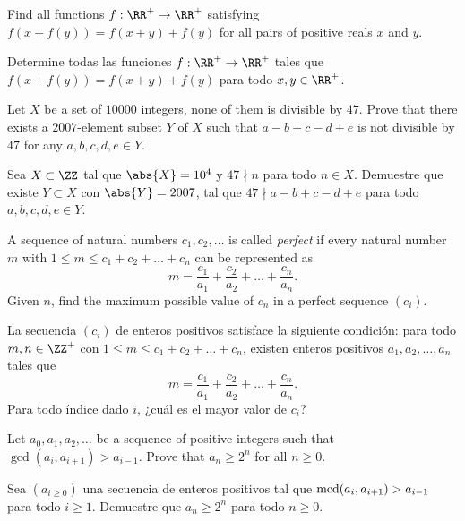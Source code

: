 \begin{probMR}
	Find all functions $f:\RR^+\to\RR^+$ satisfying $f(x+f(y))=f(x+y)+f(y)$ for all pairs of positive reals $x$ and $y$.
	\begin{probSP}
		Determine todas las funciones $f:\RR^+\to\RR^+$ tales que $f(x+f(y))=f(x+y)+f(y)$ para todo $x,y\in\RR^+$.
	\end{probSP}
\end{probMR}

\begin{probMR}
	Let $X$ be a set of $10000$ integers, none of them is divisible by $47$. Prove that there exists a $2007$-element subset $Y$ of $X$ such that $a-b+c-d+e$ is not divisible by $47$ for any $a,b,c,d,e\in Y$.
	\begin{probSP}
		Sea $X\subset\ZZ$ tal que $\abs{X}=10^4$ y $47\nmid n$ para todo $n\in X$. Demuestre que existe $Y\subset X$ con $\abs{Y}=2007$, tal que $47\nmid a-b+c-d+e$ para todo $a,b,c,d,e\in Y$.
	\end{probSP}
\end{probMR}

\begin{probEG}
	A sequence of natural numbers $c_1,c_2,\dots$ is called \emph{perfect} if every natural number $m$ with $1\le m\le c_1+c_2+\dots+c_n$ can be represented as
	\[m=\frac{c_1}{a_1}+\frac{c_2}{a_2}+\dots+\frac{c_n}{a_n}.\]
	Given $n$, find the maximum possible value of $c_n$ in a perfect sequence $(c_i)$.
	\begin{probSP}
		La secuencia $(c_i)$ de enteros positivos satisface la siguiente condición: para todo $m,n\in\ZZ^+$ con $1\le m\le c_1+c_2+\dots+c_n$, existen enteros positivos $a_1,a_2,\dots,a_n$ tales que
		\[m=\frac{c_1}{a_1}+\frac{c_2}{a_2}+\dots+\frac{c_n}{a_n}.\]
		Para todo índice dado $i$, ¿cuál es el mayor valor de $c_i$?
	\end{probSP}
\end{probEG}

\begin{probMR}
	Let $a_0,a_1,a_2,\dots$ be a sequence of positive integers such that $\gcd(a_i,a_{i+1})>a_{i-1}$. Prove that $a_n\ge 2^n$ for all $n\ge 0$.
	\begin{probSP}
		Sea $(a_{i\ge 0})$ una secuencia de enteros positivos tal que $\operatorname{mcd}(a_i,a_{i+1})>a_{i-1}$ para todo $i\ge 1$. Demuestre que $a_n\ge 2^n$ para todo $n\ge 0$.
	\end{probSP}
\end{probMR}

